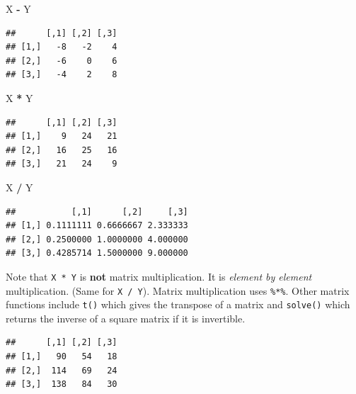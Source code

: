 \documentclass[]{book}
\newenvironment{Shaded}{\begin{snugshade}}{\end{snugshade}}
\newcommand{\StringTok}[1]{\textcolor[rgb]{0.31,0.60,0.02}{#1}}
\newcommand{\OperatorTok}[1]{\textcolor[rgb]{0.81,0.36,0.00}{\textbf{#1}}}
\newcommand{\NormalTok}[1]{#1}
\theoremstyle{definition}
\theoremstyle{definition}
\theoremstyle{definition}
\theoremstyle{remark}
\begin{document}
\begin{Shaded}
\begin{Highlighting}[]
\NormalTok{X }\OperatorTok{-}\StringTok{ }\NormalTok{Y}
\end{Highlighting}
\end{Shaded}

\begin{verbatim}
##      [,1] [,2] [,3]
## [1,]   -8   -2    4
## [2,]   -6    0    6
## [3,]   -4    2    8
\end{verbatim}

\begin{Shaded}
\begin{Highlighting}[]
\NormalTok{X }\OperatorTok{*}\StringTok{ }\NormalTok{Y}
\end{Highlighting}
\end{Shaded}

\begin{verbatim}
##      [,1] [,2] [,3]
## [1,]    9   24   21
## [2,]   16   25   16
## [3,]   21   24    9
\end{verbatim}

\begin{Shaded}
\begin{Highlighting}[]
\NormalTok{X }\OperatorTok{/}\StringTok{ }\NormalTok{Y}
\end{Highlighting}
\end{Shaded}

\begin{verbatim}
##           [,1]      [,2]     [,3]
## [1,] 0.1111111 0.6666667 2.333333
## [2,] 0.2500000 1.0000000 4.000000
## [3,] 0.4285714 1.5000000 9.000000
\end{verbatim}

Note that \texttt{X\ *\ Y} is \textbf{not} matrix multiplication. It is
\emph{element by element} multiplication. (Same for \texttt{X\ /\ Y}).
Matrix multiplication uses \texttt{\%*\%}. Other matrix functions
include \texttt{t()} which gives the transpose of a matrix and
\texttt{solve()} which returns the inverse of a square matrix if it is
invertible.

\begin{Shaded}
\end{Shaded}

\begin{verbatim}
##      [,1] [,2] [,3]
## [1,]   90   54   18
## [2,]  114   69   24
## [3,]  138   84   30
\end{verbatim}
\end{document}
